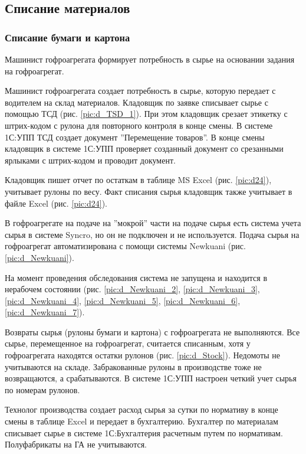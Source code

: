 \newpage
%
\subsection{Списание материалов}
\label{bp:MatOutput}

\subsubsection{Списание бумаги и картона}

Машинист гофроагрегата формирует потребность в сырье на основании задания на гофроагрегат.

Машинист гофроагрегата создает потребность в сырье, которую передает с водителем на склад материалов.
Кладовщик по заявке списывает сырье с помощью ТСД (рис. \ref{pic:d_TSD_1}). При этом кладовщик срезает этикетку с штрих-кодом с рулона для повторного контроля в конце смены.
В системе 1С:УПП ТСД создает документ ''Перемещение товаров''. В конце смены кладовщик в системе 1С:УПП проверяет созданный документ со срезанными ярлыками с штрих-кодом и проводит документ.


Кладовщик пишет отчет по остаткам в таблице MS Excel (рис. \ref{pic:d24}), учитывает рулоны по весу.
Факт списания сырья кладовщик также учитывает в файле Excel  (рис. \ref{pic:d24}).

В гофроагрегате на подаче на ''мокрой'' части на подаче сырья есть система учета сырья в системе Syncro, но он не подключен и не используется.
Подача сырья на гофроагрегат автоматизирована с помощи системы Newkuani (рис. \ref{pic:d_Newkuani}).

На момент проведения обследования система не запущена и находится в нерабочем состоянии (рис. \ref{pic:d_Newkuani_2}, \ref{pic:d_Newkuani_3}, \ref{pic:d_Newkuani_4}, \ref{pic:d_Newkuani_5}, \ref{pic:d_Newkuani_6}, \ref{pic:d_Newkuani_7}).

Возвраты сырья (рулоны бумаги и картона) с гофроагрегата не выполняются. Все сырье, перемещенное на гофроагрегат, считается списанным, хотя у гофроагрегата находятся остатки рулонов (рис. \ref{pic:d_Stock}). Недомоты не учитываются на складе.  
Забракованные рулоны в производстве тоже не возвращаются, а срабатываются.
В системе 1С:УПП настроен четкий учет сырья  по номерам рулонов.


Технолог производства создает расход сырья за сутки по нормативу в конце смены в таблице Excel и передает в бухгалтерию. Бухгалтер по материалам списывает сырье в системе 1С:Бухгалтерия расчетным путем по нормативам.
Полуфабрикаты на ГА не учитываются.





